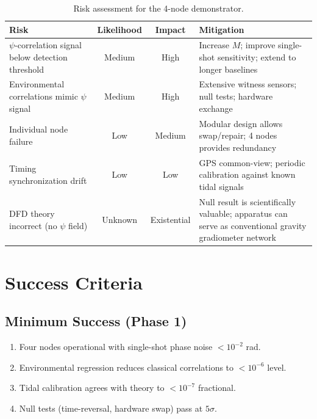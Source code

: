 \documentclass[12pt,a4paper]{article}
\begin{document}
\begin{table}[H]
\centering
\small
\begin{tabular}{p{4cm}ccp{5cm}}
\toprule
\textbf{Risk} & \textbf{Likelihood} & \textbf{Impact} & \textbf{Mitigation} \\
\midrule
$\psi$-correlation signal below detection threshold & Medium & High &
Increase $M$; improve single-shot sensitivity; extend to longer baselines \\
Environmental correlations mimic $\psi$ signal & Medium & High &
Extensive witness sensors; null tests; hardware exchange \\
Individual node failure & Low & Medium &
Modular design allows swap/repair; 4 nodes provides redundancy \\
Timing synchronization drift & Low & Low &
GPS common-view; periodic calibration against known tidal signals \\
DFD theory incorrect (no $\psi$ field) & Unknown & Existential &
Null result is scientifically valuable; apparatus can serve as
conventional gravity gradiometer network \\
\bottomrule
\end{tabular}
\caption{Risk assessment for the 4-node demonstrator.}
\label{tab:risk}
\end{table}


\section{Success Criteria}\label{sec:success}

\subsection{Minimum Success (Phase 1)}

\begin{enumerate}
\item Four nodes operational with single-shot phase noise $< 10^{-2}$ rad.
\item Environmental regression reduces classical correlations to
$< 10^{-6}$ level.
\item Tidal calibration agrees with theory to $< 10^{-7}$ fractional.
\item Null tests (time-reversal, hardware swap) pass at $5\sigma$.
\end{enumerate}
\end{document}
